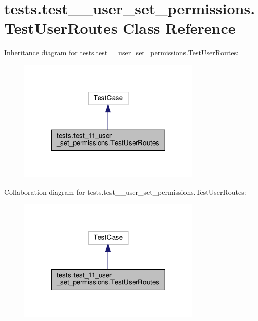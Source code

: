 \hypertarget{classtests_1_1test__11__user__set__permissions_1_1_test_user_routes}{}\section{tests.\+test\+\_\+\_\+user\+\_\+set\+\_\+permissions.\+Test\+User\+Routes Class Reference}
\label{classtests_1_1test__11__user__set__permissions_1_1_test_user_routes}


Inheritance diagram for tests.\+test\+\_\+\_\+user\+\_\+set\+\_\+permissions.\+Test\+User\+Routes\+:
\nopagebreak
\begin{figure}[H]
\begin{center}
\leavevmode
\includegraphics[width=248pt]{classtests_1_1test__11__user__set__permissions_1_1_test_user_routes__inherit__graph}
\end{center}
\end{figure}


Collaboration diagram for tests.\+test\+\_\+\_\+user\+\_\+set\+\_\+permissions.\+Test\+User\+Routes\+:
\nopagebreak
\begin{figure}[H]
\begin{center}
\leavevmode
\includegraphics[width=248pt]{classtests_1_1test__11__user__set__permissions_1_1_test_user_routes__coll__graph}
\end{center}
\end{figure}

